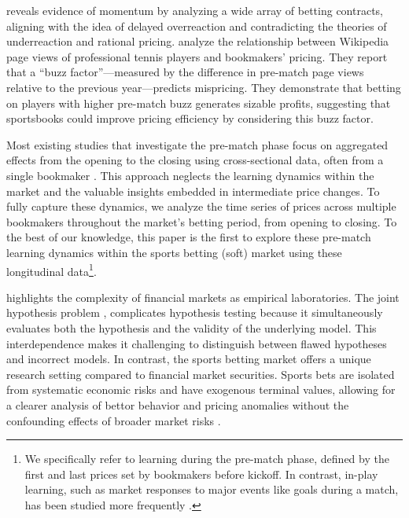 \documentclass[webpdf,modern,medium]{oup-authoring-template}
\theoremstyle{thmstyleone}%
\theoremstyle{thmstyletwo}%
\theoremstyle{thmstylethree}%
\begin{document}
\citet{moskowitz2021} reveals evidence of momentum by analyzing a wide array of betting contracts, aligning with the idea of delayed overreaction and contradicting the theories of underreaction and rational pricing. \citet{ramirez2023} analyze the relationship between Wikipedia page views of professional tennis players and bookmakers' pricing. They report that a ``buzz factor''---measured by the difference in pre-match page views relative to the previous year---predicts mispricing. They demonstrate that betting on players with higher pre-match buzz generates sizable profits, suggesting that sportsbooks could improve pricing efficiency by considering this buzz factor.

Most existing studies that investigate the pre-match phase focus on aggregated effects from the opening to the closing using cross-sectional data, often from a single bookmaker \citep[e.g.,][]{gandar1998}. This approach neglects the learning dynamics within the market and the valuable insights embedded in intermediate price changes. To fully capture these dynamics, we analyze the time series of prices across multiple bookmakers throughout the market's betting period, from opening to closing. To the best of our knowledge, this paper is the first to explore these pre-match learning dynamics within the sports betting (soft) market using these longitudinal data\footnote{We specifically refer to learning during the pre-match phase, defined by the first and last prices set by bookmakers before kickoff. In contrast, in-play learning, such as market responses to major events like goals during a match, has been studied more frequently \citep[e.g.,][]{croxson2014, angelini2022}.}.



\citet{moskowitz2021} highlights the complexity of financial markets as empirical laboratories. The joint hypothesis problem \citep{fama1970}, complicates hypothesis testing because it simultaneously evaluates both the hypothesis and the validity of the underlying model. This interdependence makes it challenging to distinguish between flawed hypotheses and incorrect models.
In contrast, the sports betting market offers a unique research setting compared to financial market securities. Sports bets are isolated from systematic economic risks and have exogenous terminal values, allowing for a clearer analysis of bettor behavior and pricing anomalies without the confounding effects of broader market risks \citep{moskowitz2021,palacioshuerta2023}.
\end{document}
